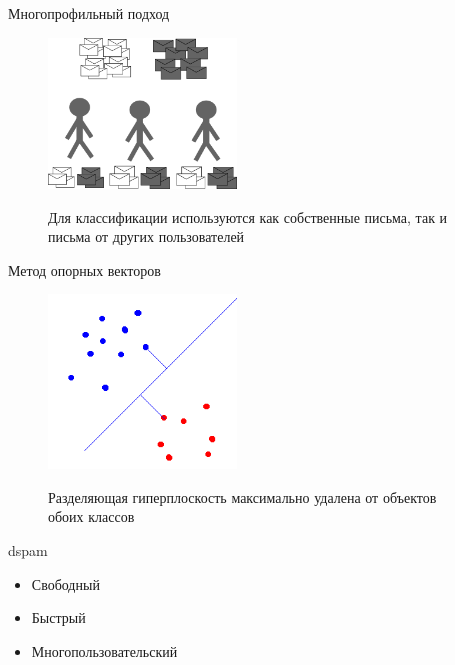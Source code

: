 \documentclass{beamer}
\begin{document}
\begin{frame}{Многопрофильный подход}
\begin{figure}[h]
\begin{center}
    \includegraphics[width=5cm]{img/multiprofile}
\end{center}
    Для классификации используются как собственные письма, так и письма от других пользователей
\end{figure}
\end{frame}

\begin{frame}{Метод опорных векторов}
\begin{figure}[h]
\begin{center}
    \includegraphics[width=5cm]{../img/svm}
\end{center}
    Разделяющая гиперплоскость максимально удалена от объектов обоих классов
\end{figure}
\end{frame}


\begin{frame}{dspam}
    \begin{itemize}
        \item Свободный
        \item Быстрый
        \item Многопользовательский
    \end{itemize}
\end{frame}
\end{document}
